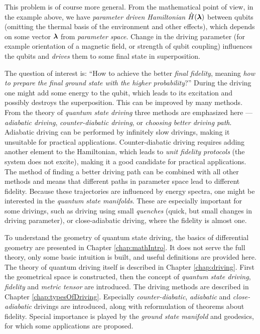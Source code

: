 This problem is of course more general. From the mathematical point of view, in the example above, we have \emph{parameter driven Hamiltonian} $\hat{H}({\bm\lambda})$ between qubits (omitting the thermal basis of the environment and other effects), which depends on some vector ${\bm\lambda}$ from \emph{parameter space}. Change in the driving parameter (for example orientation of a magnetic field, or strength of qubit coupling) influences the qubits and \emph{drives} them to some final state in superposition.

The question of interest is: “How to achieve the better \emph{final fidelity}, meaning \emph{how to prepare the final ground state with the higher probability}?” During the driving one might add some energy to the qubit, which leads to its excitation and possibly destroys the superposition. This can be improved by many methods. From the theory of \emph{quantum state driving} three methods are emphasized here — \emph{adiabatic driving}, \emph{counter-diabatic driving}, or \emph{choosing better driving path}. Adiabatic driving can be performed by infinitely slow drivings, making it unsuitable for practical applications. Counter-diabatic driving requires adding another element to the Hamiltonian, which leads to \emph{unit fidelity protocols} (the system does not excite), making it a good candidate for practical applications. The method of finding a better driving path can be combined with all other methods and means that different paths in parameter space lead to different fidelity. Because these trajectories are influenced by energy spectra, one might be interested in the \emph{quantum state manifolds}. These are especially important for some drivings, such as driving using small \emph{quenches} (quick, but small changes in driving parameter), or close-adiabatic driving, where the fidelity is almost one.

To understand the geometry of quantum state driving, the basics of differential geometry are presented in Chapter \ref{chap:mathIntro}. It does not serve the full theory, only some basic intuition is built, and useful definitions are provided here. The theory of quantum driving itself is described in Chapter \ref{chap:driving}. First the geometrical space is constructed, then the concept of \emph{quantum state driving}, \emph{fidelity} and \emph{metric tensor} are introduced.
The driving methods are described in Chapter \ref{chap:typesOfDriving}. Especially \emph{counter-diabatic}, \emph{adiabatic} and \emph{close-adiabatic} drivings are introduced, along with reformulation of theorems about fidelity. Special importance is played by the \emph{ground state manifold} and geodesics, for which some applications are proposed.

